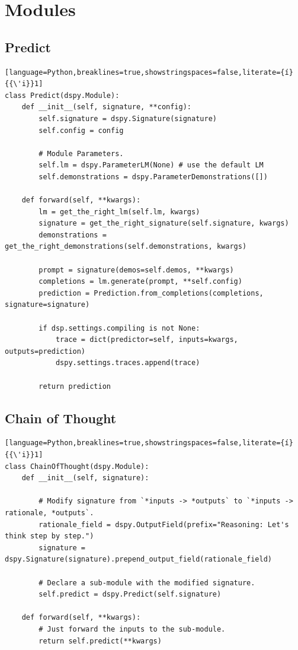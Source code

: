\clearpage







\section{Modules}\label{sec:modules_pseudocode}
\subsection{Predict}\label{code:predict}
\begin{samepage}
\begin{lstlisting}[language=Python,breaklines=true,showstringspaces=false,literate={í}{{\'i}}1]
class Predict(dspy.Module):
    def __init__(self, signature, **config):
        self.signature = dspy.Signature(signature)
        self.config = config
        
        # Module Parameters.
        self.lm = dspy.ParameterLM(None) # use the default LM
        self.demonstrations = dspy.ParameterDemonstrations([])
    
    def forward(self, **kwargs):
        lm = get_the_right_lm(self.lm, kwargs)
        signature = get_the_right_signature(self.signature, kwargs)
        demonstrations = get_the_right_demonstrations(self.demonstrations, kwargs)
        
        prompt = signature(demos=self.demos, **kwargs)
        completions = lm.generate(prompt, **self.config)
        prediction = Prediction.from_completions(completions, signature=signature)
        
        if dsp.settings.compiling is not None:
            trace = dict(predictor=self, inputs=kwargs, outputs=prediction)
            dspy.settings.traces.append(trace)
            
        return prediction
\end{lstlisting}
\end{samepage}

\subsection{Chain of Thought}\label{code:CoT}
\begin{samepage}
\begin{lstlisting}[language=Python,breaklines=true,showstringspaces=false,literate={í}{{\'i}}1]
class ChainOfThought(dspy.Module):
    def __init__(self, signature):
        
        # Modify signature from `*inputs -> *outputs` to `*inputs -> rationale, *outputs`.
        rationale_field = dspy.OutputField(prefix="Reasoning: Let's think step by step.")
        signature = dspy.Signature(signature).prepend_output_field(rationale_field)

        # Declare a sub-module with the modified signature.
        self.predict = dspy.Predict(self.signature)
    
    def forward(self, **kwargs):
        # Just forward the inputs to the sub-module.
        return self.predict(**kwargs)
\end{lstlisting}
\end{samepage}


